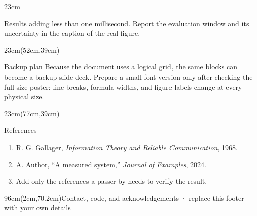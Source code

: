 \documentclass[final]{beamer}
\begin{document}
\begin{frame}[t]
\begin{textblock*}{23cm}
\begin{block}{Results}
  adding less than one millisecond. Report the evaluation window and its
  uncertainty in the caption of the real figure.
\end{block}\end{textblock*}
\begin{textblock*}{23cm}(52cm,39cm)\begin{block}{Backup plan}
  Because the document uses a logical grid, the same blocks can become a
  backup slide deck. Prepare a small-font version only after checking the
  full-size poster: line breaks, formula widths, and figure labels change at
  every physical size.
\end{block}\end{textblock*}
\begin{textblock*}{23cm}(77cm,39cm)\begin{block}{References}
  \begin{enumerate}\itemsep0.3em\small
    \item R. G. Gallager, \textit{Information Theory and Reliable Communication}, 1968.
    \item A. Author, ``A measured system,'' \textit{Journal of Examples}, 2024.
    \item Add only the references a passer-by needs to verify the result.
  \end{enumerate}
\end{block}\end{textblock*}
\begin{textblock*}{96cm}(2cm,70.2cm)\centering\color{wirelessblue}\large Contact, code, and acknowledgements · replace this footer with your own details\end{textblock*}
\end{frame}
\end{document}
